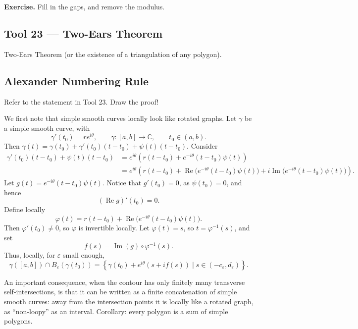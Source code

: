 \documentclass[11pt,a4paper]{article}
\begin{document}
\textbf{Exercise.}
Fill in the gaps, and remove the modulus.

\subsection*{Tool 23 — Two-Ears Theorem}
Two-Ears Theorem (or the existence of a triangulation of any polygon).


\subsection*{Alexander Numbering Rule}
Refer to the statement in Tool 23. Draw the proof!

We first note that simple smooth curves locally look like rotated graphs. Let \(\gamma\) be a simple smooth curve, with
\[
  \gamma'(t_0)=re^{i\theta},
  \qquad
  \gamma:[a,b]\to\mathbb C,
  \qquad t_0\in(a,b).
\]
Then \(\gamma(t)=\gamma(t_0)+\gamma'(t_0)(t-t_0)+\psi(t)(t-t_0).\)
Consider
\begin{align*}
  \gamma'(t_0)(t-t_0)+\psi(t)(t-t_0)
  &=e^{i\theta}\left(r(t-t_0)+e^{-i\theta}(t-t_0)\psi(t)\right)\\
  &=e^{i\theta}\left(
    r(t-t_0)+\operatorname{Re}\bigl(e^{-i\theta}(t-t_0)\psi(t)\bigr)
    +i\operatorname{Im}\bigl(e^{-i\theta}(t-t_0)\psi(t)\bigr)
  \right).
\end{align*}
Let \(g(t)=e^{-i\theta}(t-t_0)\psi(t).\)
Notice that \(g'(t_0)=0\), as \(\psi(t_0)=0\), and hence
\[
  (\operatorname{Re}g)'(t_0)=0.
\]
Define locally
\[
  \varphi(t)=r(t-t_0)+\operatorname{Re}\bigl(e^{-i\theta}(t-t_0)\psi(t)\bigr).
\]
Then \(\varphi'(t_0)\ne0\), so \(\varphi\) is invertible locally. Let \(\varphi(t)=s\), so \(t=\varphi^{-1}(s)\), and set
\[
  f(s)=\operatorname{Im}(g)\circ\varphi^{-1}(s).
\]
Thus, locally, for \(\varepsilon\) small enough,
\[
  \gamma([a,b])\cap B_\varepsilon(\gamma(t_0))
  =\left\{\gamma(t_0)+e^{i\theta}(s+if(s))
  \mid s\in(-c_\varepsilon,d_\varepsilon)\right\}.
\]

An important consequence, when the contour has only finitely many transverse self-intersections, is that it can be written as a finite concatenation of simple smooth curves: away from the intersection points it is locally like a rotated graph, as ``non-loopy'' as an interval. Corollary: every polygon is a sum of simple polygons.
\end{document}
